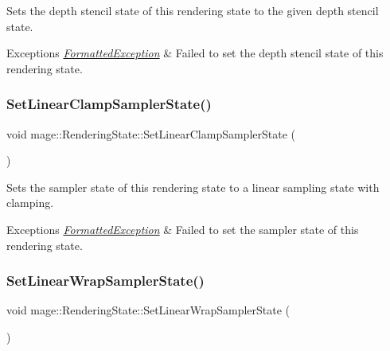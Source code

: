 Sets the depth stencil state of this rendering state to the given depth stencil state.


\begin{DoxyExceptions}{Exceptions}
{\em \hyperlink{structmage_1_1_formatted_exception}{Formatted\+Exception}} & Failed to set the depth stencil state of this rendering state. \\
\hline
\end{DoxyExceptions}
\hypertarget{structmage_1_1_rendering_state_a4f414c7bed884194bd93d89f893c86b4}{}\label{structmage_1_1_rendering_state_a4f414c7bed884194bd93d89f893c86b4} 
\subsubsection{\texorpdfstring{Set\+Linear\+Clamp\+Sampler\+State()}{SetLinearClampSamplerState()}}
{\footnotesize\ttfamily void mage\+::\+Rendering\+State\+::\+Set\+Linear\+Clamp\+Sampler\+State (\begin{DoxyParamCaption}{ }\end{DoxyParamCaption})}

Sets the sampler state of this rendering state to a linear sampling state with clamping.


\begin{DoxyExceptions}{Exceptions}
{\em \hyperlink{structmage_1_1_formatted_exception}{Formatted\+Exception}} & Failed to set the sampler state of this rendering state. \\
\hline
\end{DoxyExceptions}
\hypertarget{structmage_1_1_rendering_state_a6ffd109271b4988fa6d4a6fc2daa2125}{}\label{structmage_1_1_rendering_state_a6ffd109271b4988fa6d4a6fc2daa2125} 
\subsubsection{\texorpdfstring{Set\+Linear\+Wrap\+Sampler\+State()}{SetLinearWrapSamplerState()}}
{\footnotesize\ttfamily void mage\+::\+Rendering\+State\+::\+Set\+Linear\+Wrap\+Sampler\+State (\begin{DoxyParamCaption}{ }\end{DoxyParamCaption})}

